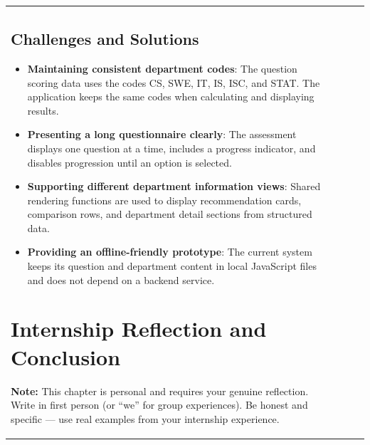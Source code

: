 \documentclass[12pt, a4paper]{article}
\begin{document}
\begin{itemize}[leftmargin=1.5em, itemsep=3pt]
\begin{table}[H]
\begin{tabularx}{\textwidth}{>{\raggedright\arraybackslash}p{0.8cm}>{\raggedright\arraybackslash}p{3.5cm}>{\raggedright\arraybackslash}X>{\raggedright\arraybackslash}p{2.5cm}}
\subsection{Challenges and Solutions}

\begin{itemize}[leftmargin=1.5em, itemsep=3pt]
    \item \textbf{Maintaining consistent department codes}: The question scoring data uses the codes CS, SWE, IT, IS, ISC, and STAT. The application keeps the same codes when calculating and displaying results.
    \item \textbf{Presenting a long questionnaire clearly}: The assessment displays one question at a time, includes a progress indicator, and disables progression until an option is selected.
    \item \textbf{Supporting different department information views}: Shared rendering functions are used to display recommendation cards, comparison rows, and department detail sections from structured data.
    \item \textbf{Providing an offline-friendly prototype}: The current system keeps its question and department content in local JavaScript files and does not depend on a backend service.
\end{itemize}



\newpage
\clearpage
\section{Internship Reflection and Conclusion}
\begin{tcolorbox}[enhanced, colback=accentgold!10, colframe=accentgold, arc=3pt, boxrule=1pt, top=6pt, bottom=6pt]
\textbf{Note:} This chapter is personal and requires your genuine reflection. Write in first person (or ``we'' for group experiences). Be honest and specific --- use real examples from your internship experience.
\end{tcolorbox}


\end{tabularx}
\end{table}
\end{itemize}
\end{document}
